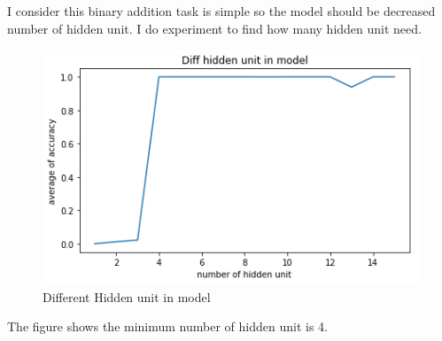 \documentclass[12pt]{article}
\begin{document}
I consider this binary addition task is simple so the model should be decreased number of hidden unit. I do experiment to find how many hidden unit need.

\begin{figure}[H]
\centering
\includegraphics[width=\linewidth]{Images/DiffHU.png}
\caption{Different Hidden unit in model}
\end{figure}

The figure shows the minimum number of hidden unit is 4.





 
\end{document}
